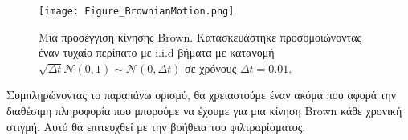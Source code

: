\documentclass[12pt,a4paper,twoside,openany]{book}
\begin{document}
		\begin{figure}[h]
			\centering
			\texttt{[image: Figure\_ΒrownianMotion.png]}
			\caption{Μια προσέγγιση κίνησης Brown. Κατασκευάστηκε προσομοιώνοντας έναν τυχαίο περίπατο με i.i.d βήματα με κατανομή $\sqrt{\Delta t} \mathcal{N}(0,1) \sim \mathcal{N}(0, \Delta t)$ σε χρόνους $\Delta t=0.01$.}
			\label{fig:Brown}
			\vspace{4mm}
		\end{figure}
		
		\noindent Συμπληρώνοντας το παραπάνω ορισμό, θα χρειαστούμε έναν ακόμα που αφορά την διαθέσιμη πληροφορία που μπορούμε να έχουμε για μια κίνηση Brown κάθε χρονική στιγμή. Αυτό θα επιτευχθεί με την βοήθεια του φιλτραρίσματος.
		\vspace{2.5mm}
		
\end{document}
